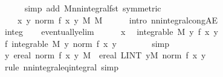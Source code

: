 \documentclass[leqno]{article}
\theoremstyle{definition}
\begin{document}
\begin{figure}
\begin{isabellebody}
\ \ \ \ \isamarkupfalse%
\ {\isacharparenleft}simp\ add{\isacharcolon}\ M{}{\isachardot}nn{\isacharunderscore}integral{\isacharunderscore}fst\ {\isacharbrackleft}symmetric{\isacharbrackright}{\isacharparenright}\isanewline
\ \ \isamarkupfalse%
\ \isamarkupfalse%
\ {\isachardoublequoteopen}{\isasymdots}\ {\isacharequal}\ {\isacharparenleft}{\isasymintegral}\isactrlsup {\isacharplus}\ x{\isachardot}\ {\isasymbar}{\isasymintegral}y{\isachardot}\ norm\ {\isacharparenleft}f\ {\isacharparenleft}x{\isacharcomma}\ y{\isacharparenright}{\isacharparenright}\ {\isasympartial}M{}{\isasymbar}\ {\isasympartial}M{}{\isacharparenright}{\isachardoublequoteclose}\isanewline
\ \ \ \ \isamarkupfalse%
\ {\isacharparenleft}intro\ nn{\isacharunderscore}integral{\isacharunderscore}cong{\isacharunderscore}AE{\isacharparenright}\isanewline
\ \ \ \ \isamarkupfalse%
\ integ{}\isanewline
\ \ \isamarkupfalse%
\ eventually{\isacharunderscore}elim\isanewline
\ \ \ \ \isamarkupfalse%
\ x\ \isamarkupfalse%
\ {\isachardoublequoteopen}integrable\ M{}\ {\isacharparenleft}{\isasymlambda}y{\isachardot}\ f\ {\isacharparenleft}x{\isacharcomma}\ y{\isacharparenright}{\isacharparenright}{\isachardoublequoteclose}\isanewline
\ \ \ \ \isamarkupfalse%
\ \isamarkupfalse%
\ f{\isacharcolon}\ {\isachardoublequoteopen}integrable\ M{}\ {\isacharparenleft}{\isasymlambda}y{\isachardot}\ norm\ {\isacharparenleft}f\ {\isacharparenleft}x{\isacharcomma}\ y{\isacharparenright}{\isacharparenright}{\isacharparenright}{\isachardoublequoteclose}\isanewline
\ \ \ \ \ \ \isamarkupfalse%
\ simp\isanewline
\ \ \ \ \isamarkupfalse%
\ \isamarkupfalse%
\ {\isachardoublequoteopen}{\isacharparenleft}{\isasymintegral}\isactrlsup {\isacharplus}y{\isachardot}\ ereal\ {\isacharparenleft}norm\ {\isacharparenleft}f\ {\isacharparenleft}x{\isacharcomma}\ y{\isacharparenright}{\isacharparenright}{\isacharparenright}\ {\isasympartial}M{}{\isacharparenright}\ {\isacharequal}\ ereal\ {\isacharparenleft}LINT\ y{\isacharbar}M{}{\isachardot}\ norm\ {\isacharparenleft}f\ {\isacharparenleft}x{\isacharcomma}\ y{\isacharparenright}{\isacharparenright}{\isacharparenright}{\isachardoublequoteclose}\isanewline
\ \ \ \ \ \ \isamarkupfalse%
\ {\isacharparenleft}rule\ nn{\isacharunderscore}integral{\isacharunderscore}eq{\isacharunderscore}integral{\isacharparenright}\ simp\isanewline

\end{isabellebody}
\end{figure}
\end{document}
